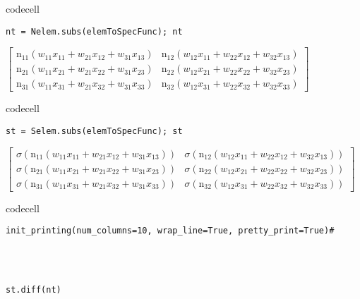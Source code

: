 codecell

\begin{verbatim}
nt = Nelem.subs(elemToSpecFunc); nt
\end{verbatim}

$\displaystyle \left[\begin{matrix}\operatorname{n_{11}}{\left(w_{11} x_{11} + w_{21} x_{12} + w_{31} x_{13} \right)} & \operatorname{n_{12}}{\left(w_{12} x_{11} + w_{22} x_{12} + w_{32} x_{13} \right)}\\\operatorname{n_{21}}{\left(w_{11} x_{21} + w_{21} x_{22} + w_{31} x_{23} \right)} & \operatorname{n_{22}}{\left(w_{12} x_{21} + w_{22} x_{22} + w_{32} x_{23} \right)}\\\operatorname{n_{31}}{\left(w_{11} x_{31} + w_{21} x_{32} + w_{31} x_{33} \right)} & \operatorname{n_{32}}{\left(w_{12} x_{31} + w_{22} x_{32} + w_{32} x_{33} \right)}\end{matrix}\right]$

codecell

\begin{verbatim}
st = Selem.subs(elemToSpecFunc); st
\end{verbatim}

$\displaystyle \left[\begin{matrix}\sigma{\left(\operatorname{n_{11}}{\left(w_{11} x_{11} + w_{21} x_{12} + w_{31} x_{13} \right)} \right)} & \sigma{\left(\operatorname{n_{12}}{\left(w_{12} x_{11} + w_{22} x_{12} + w_{32} x_{13} \right)} \right)}\\\sigma{\left(\operatorname{n_{21}}{\left(w_{11} x_{21} + w_{21} x_{22} + w_{31} x_{23} \right)} \right)} & \sigma{\left(\operatorname{n_{22}}{\left(w_{12} x_{21} + w_{22} x_{22} + w_{32} x_{23} \right)} \right)}\\\sigma{\left(\operatorname{n_{31}}{\left(w_{11} x_{31} + w_{21} x_{32} + w_{31} x_{33} \right)} \right)} & \sigma{\left(\operatorname{n_{32}}{\left(w_{12} x_{31} + w_{22} x_{32} + w_{32} x_{33} \right)} \right)}\end{matrix}\right]$

codecell


\begin{verbatim}
init_printing(num_columns=10, wrap_line=True, pretty_print=True)#




st.diff(nt)
\end{verbatim}

